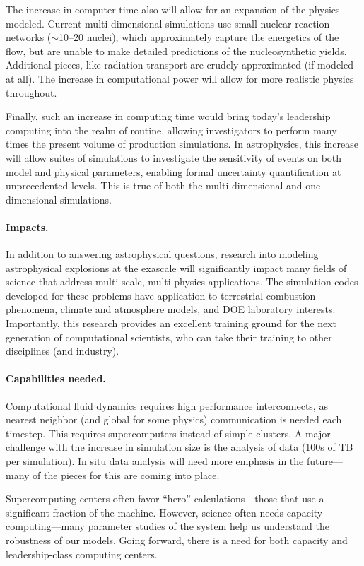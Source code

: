\documentclass[11pt,twocolumn]{article}
\begin{document}
The increase in computer time also will allow for an expansion of the
physics modeled.  Current multi-dimensional simulations use small
nuclear reaction networks ($\sim$10--20 nuclei), which approximately
capture the energetics of the flow, but are unable to make detailed
predictions of the nucleosynthetic yields.  Additional pieces, like
radiation transport are crudely approximated (if modeled at all).  The
increase in computational power will allow for more realistic physics
throughout.

Finally, such an increase in computing time would bring today's
leadership computing into the realm of routine, allowing investigators
to perform many times the present volume of production simulations.
In astrophysics, this increase will allow suites of simulations to
investigate the sensitivity of events on both model and physical
parameters, enabling formal uncertainty quantification at
unprecedented levels.  This is true of both the multi-dimensional and
one-dimensional simulations.

\paragraph*{Impacts.}
In addition to answering astrophysical questions, research into
modeling astrophysical explosions at the exascale will significantly
impact many fields of science that address multi-scale, multi-physics
applications.  The simulation codes developed for these problems have
application to terrestrial combustion phenomena, climate and
atmosphere models, and DOE laboratory interests.  Importantly, this
research provides an excellent training ground for the next generation
of computational scientists, who can take their training to other
disciplines (and industry).


\paragraph*{Capabilities needed.}  Computational fluid dynamics requires
high performance interconnects, as nearest neighbor (and global for
some physics) communication is needed each timestep.  This requires
supercomputers instead of simple clusters.  A major challenge with the
increase in simulation size is the analysis of data (100s of TB
per simulation).  In situ data analysis will need more emphasis in the
future---many of the pieces for this are coming into place.

Supercomputing centers often favor ``hero'' calculations---those that
use a significant fraction of the machine.
However, science often needs capacity computing---many parameter
studies of the system help us understand the robustness of our models.
Going forward, there is a need for both capacity and leadership-class
computing centers.
\end{document}
